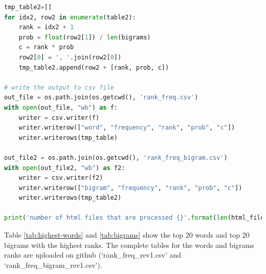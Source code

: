 \documentclass[letterpaper,11pt]{article}
\begin{document}
\begin{lstlisting}[language=python, caption={Tokenizing the content of Wikipedia collection}, label={lst:token-wiki}]
tmp_table2=[]
for idx2, row2 in enumerate(table2):
    rank = idx2 + 1
    prob = float(row2[1]) / len(bigrams)
    c = rank * prob
    row2[0] = ', '.join(row2[0])
    tmp_table2.append(row2 + [rank, prob, c])

# write the output to csv file
out_file = os.path.join(os.getcwd(), 'rank_freq.csv')
with open(out_file, "wb") as f:
    writer = csv.writer(f)
    writer.writerow(["word", "frequency", "rank", "prob", "c"])
    writer.writerows(tmp_table)

out_file2 = os.path.join(os.getcwd(), 'rank_freq_bigram.csv')
with open(out_file2, "wb") as f2:
    writer = csv.writer(f2)
    writer.writerow(["bigram", "frequency", "rank", "prob", "c"])
    writer.writerows(tmp_table2)

print('number of html files that are processed {}'.format(len(html_files)))

\end{lstlisting}

Table \ref{tab:highest-words} and \ref{tab:bigrams} show the top 20 words and top 20 bigrams with the highest ranks. The complete tables for the words and bigrams ranks are uploaded on github (`rank\_freq\_rev1.csv' and `rank\_freq\_bigram\_rev1.csv'). \linebreak
\end{document}
